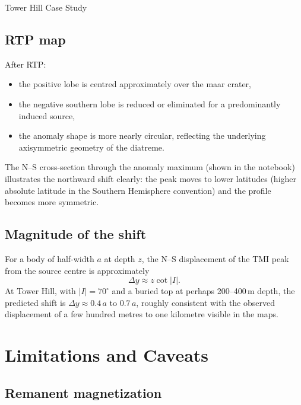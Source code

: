 \begin{activity}{Tower Hill Case Study}
\subsection{RTP map}

After RTP:
\begin{itemize}
  \item the positive lobe is centred approximately over the maar crater,
  \item the negative southern lobe is reduced or eliminated for a predominantly
        induced source,
  \item the anomaly shape is more nearly circular, reflecting the underlying
        axisymmetric geometry of the diatreme.
\end{itemize}

The N--S cross-section through the anomaly maximum (shown in the notebook)
illustrates the northward shift clearly: the peak moves to lower latitudes
(higher absolute latitude in the Southern Hemisphere convention) and the
profile becomes more symmetric.

\subsection{Magnitude of the shift}

For a body of half-width $a$ at depth $z$, the N--S displacement of the
TMI peak from the source centre is approximately
\begin{equation}
\Delta y \approx z \cot|I|.
\end{equation}
At Tower Hill, with $|I| = 70^\circ$ and a buried top at perhaps 200--400\,m
depth, the predicted shift is $\Delta y \approx 0.4\,a$ to $0.7\,a$,
roughly consistent with the observed displacement of a few hundred metres
to one kilometre visible in the maps.

\section{Limitations and Caveats}
\label{sec:limitations}

\subsection{Remanent magnetization}


\end{activity}

